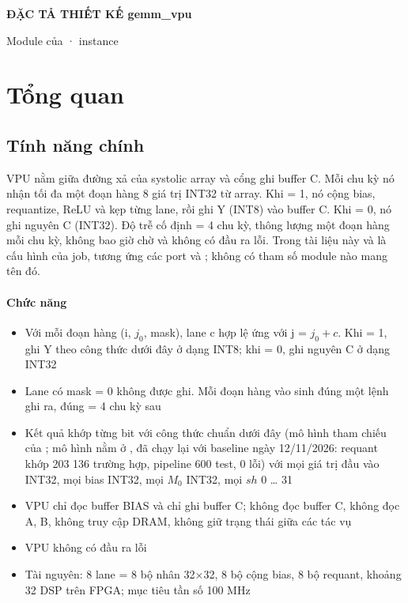 \documentclass[10pt,a4paper]{article}
\begin{document}
{\Large\bfseries ĐẶC TẢ THIẾT KẾ gemm\_vpu}\par
\vspace{2pt}
{\small\color{muted}Module của  · instance }\par
\tableofcontents
\clearpage

\section{Tổng quan}
\subsection{Tính năng chính}\label{sec:1}

VPU nằm giữa đường xả của systolic array và cổng ghi buffer C. Mỗi chu kỳ nó nhận tối đa một đoạn hàng 8 giá trị INT32 từ array. Khi  = 1, nó cộng bias, requantize, ReLU và kẹp từng lane, rồi ghi Y (INT8) vào buffer C. Khi  = 0, nó ghi nguyên C (INT32). Độ trễ cố định  = 4 chu kỳ, thông lượng một đoạn hàng mỗi chu kỳ, không bao giờ chờ và không có đầu ra lỗi. Trong tài liệu này  và  là cấu hình của job, tương ứng các port  và ; không có tham số module nào mang tên đó.

\paragraph{Chức năng}\label{par:1-1}
\begin{itemize}
\item Với mỗi đoạn hàng (i, $j_0$, mask), lane c hợp lệ ứng với j = $j_0+c$. Khi  = 1, ghi Y theo công thức dưới đây ở dạng INT8; khi  = 0, ghi nguyên C ở dạng INT32
\item Lane có mask = 0 không được ghi. Mỗi đoạn hàng vào sinh đúng một lệnh ghi ra, đúng  = 4 chu kỳ sau
\item Kết quả khớp từng bit với công thức chuẩn dưới đây (mô hình tham chiếu  của ; mô hình nằm ở , đã chạy lại với baseline ngày 12/11/2026: requant khớp 203 136 trường hợp, pipeline 600 test, 0 lỗi) với mọi giá trị đầu vào INT32, mọi bias INT32, mọi $M_0$ INT32, mọi $sh$ 0 … 31
\item VPU chỉ đọc buffer BIAS và chỉ ghi buffer C; không đọc buffer C, không đọc A, B, không truy cập DRAM, không giữ trạng thái giữa các tác vụ
\item VPU không có đầu ra lỗi
\item Tài nguyên: 8 lane = 8 bộ nhân 32×32, 8 bộ cộng bias, 8 bộ requant, khoảng 32 DSP trên FPGA; mục tiêu tần số 100 MHz
\end{itemize}
\end{document}
